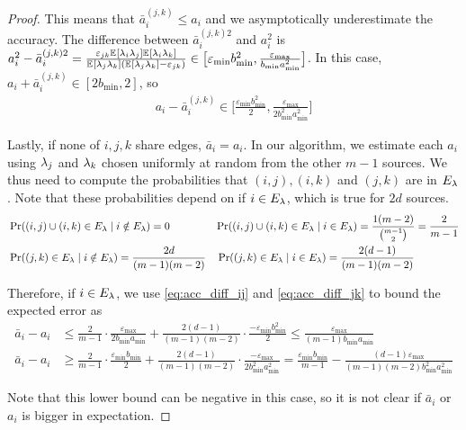\begin{proof}
This means that $\bar{a}_i^{(j, k)} \le a_i$ and we asymptotically underestimate the accuracy. The difference between $\bar{a}_i^{(j, k) 2}$ and $a_i^2$ is $a_i^2 - \bar{a}_i^{(j, k) 2}  = \frac{\varepsilon_{jk} \mathbb{E}_{}\left[\lambda_i \lambda_j\right] \mathbb{E}_{}\left[\lambda_i \lambda_k\right]}{\mathbb{E}_{}\left[\lambda_j \lambda_k\right](\mathbb{E}_{}\left[\lambda_j \lambda_k\right] - \varepsilon_{jk})} \in \big[\varepsilon_{\min} b_{\min}^2, \frac{\varepsilon_{\max}}{b_{\min}a_{\min}^2} \big]$. In this case, $a_i + \bar{a}_i^{(j, k)} \in [2b_{\min}, 2]$, so 
\begin{align}
a_i - \bar{a}_i^{(j, k)} \in \Big[\frac{\varepsilon_{\min} b_{\min}^2}{2}, \frac{\varepsilon_{\max}}{2b_{\min}^2 a_{\min}^2} \Big]
\label{eq:acc_diff_jk}
\end{align}

Lastly, if none of $i, j, k$ share edges, $\bar{a}_i = a_i$. In our algorithm, we estimate each $a_i$ using $\lambda_j$ and $\lambda_k$ chosen uniformly at random from the other $m - 1$ sources. We thus need to compute the probabilities that $(i, j), (i, k)$ and $(j, k)$ are in $E_{\lambda}$. Note that these probabilities depend on if $i \in E_{\lambda}$, which is true for $2d$ sources. 
\begin{align}
    &\Pr((i, j) \cup (i, k) \in E_{\lambda} \; | \; i \notin E_{\lambda}) = 0 \qquad \qquad \; \Pr((i, j) \cup (i, k) \in E_{\lambda} \; | \; i \in E_{\lambda}) = \frac{1(m - 2)}{{m - 1 \choose 2}} =  \frac{2}{m - 1} \nonumber \\
    &\Pr((j, k) \in E_{\lambda} \;| \; i \notin E_{\lambda}) = \frac{2d}{(m - 1)(m - 2)}  \quad \Pr((j, k) \in E_{\lambda} \;| \; i \in E_{\lambda}) = \frac{2(d - 1)}{(m - 1)(m - 2)} \nonumber
\end{align} 

Therefore, if $i \in E_{\lambda}$, we use \eqref{eq:acc_diff_ij} and \eqref{eq:acc_diff_jk} to bound the expected error as
\begin{align*}
\bar{a}_i - a_i &\le \frac{2}{m - 1} \cdot \frac{\varepsilon_{\max}}{2b_{\min} a_{\min}} + \frac{2(d - 1)}{(m - 1)(m - 2)} \cdot \frac{-\varepsilon_{\min} b_{\min}^2}{2} \le \frac{\varepsilon_{\max}}{(m - 1) b_{\min} a_{\min}} \\
\bar{a}_i - a_i &\ge \frac{2}{m - 1} \cdot \frac{\varepsilon_{\min} b_{\min}}{2} + \frac{2(d - 1)}{(m - 1)(m - 2)} \cdot \frac{-\varepsilon_{\max}}{2 b_{\min}^2 a_{\min}^2} = \frac{\varepsilon_{\min} b_{\min}}{m - 1} - \frac{(d - 1)\varepsilon_{\max}}{(m - 1)(m - 2)b^2_{\min} a^2_{\min}}
\end{align*}

Note that this lower bound can be negative in this case, so it is not clear if $\bar{a}_i$ or $a_i$ is bigger in expectation. 


\end{proof}
